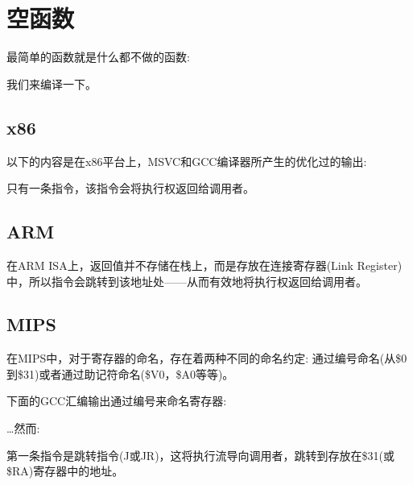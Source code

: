 \section{空函数}
\label{empty_func}

最简单的函数就是什么都不做的函数:



我们来编译一下。

\subsection{x86}

以下的内容是在x86平台上，MSVC和GCC编译器所产生的优化过的输出:



只有一条指令\RET，该指令会将执行权返回给\gls{调用者}。

\subsection{ARM}



在ARM \ac{ISA}上，返回值并不存储在栈上，而是存放在连接寄存器(Link Register)中，所以指令会跳转到该地址处——从而有效地将执行权返回给\gls{调用者}。

\subsection{MIPS}

在MIPS中，对于寄存器的命名，存在着两种不同的命名约定: 通过编号命名(从\$0到\$31)或者通过助记符命名(\$V0，\$A0等等)。

下面的GCC汇编输出通过编号来命名寄存器:



\dots 然而:



第一条指令是跳转指令(J或JR)，这将执行流导向\gls{调用者}，跳转到存放在\$31(或\$RA)寄存器中的地址。

